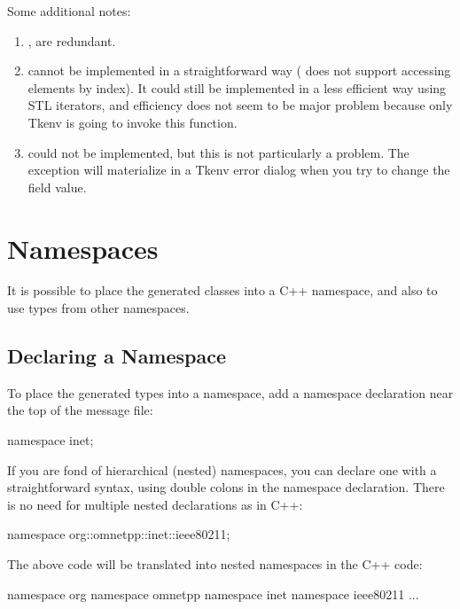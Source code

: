 Some additional notes:

\begin{enumerate}
  \item {},  are redundant.
  \item {} cannot be implemented in a straightforward way
     ( does not support accessing elements by index).
     It could still be implemented in a less efficient way using STL iterators,
     and efficiency does not seem to be major problem because only Tkenv
     is going to invoke this function.
  \item {} could not be implemented, but this
     is not particularly a problem. The exception will materialize in a
     Tkenv error dialog when you try to change the field value.
\end{enumerate}



\section{Namespaces}
\label{sec:msg-defs:namespaces}

It is possible to place the generated classes into a C++ namespace,
and also to use types from other namespaces.

\subsection{Declaring a Namespace}
\label{sec:msg-defs:declaring-a-namespace}

To place the generated types into a namespace, add a namespace declaration
near the top of the message file:

\begin{msg}
namespace inet;
\end{msg}

If you are fond of hierarchical (nested) namespaces, you can declare one
with a straightforward syntax, using double colons in the namespace
declaration. There is no need for multiple nested 
declarations as in C++:

\begin{msg}
namespace org::omnetpp::inet::ieee80211;
\end{msg}

The above code will be translated into nested namespaces in the C++ code:

\begin{cpp}
namespace org { namespace omnetpp { namespace inet { namespace ieee80211 {
...
}}}}
\end{cpp}

